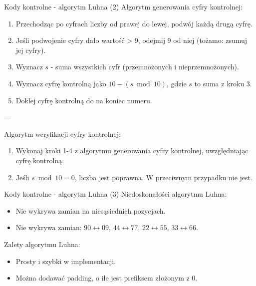 \documentclass[polish,envcountsect,10pt]{beamer}
\begin{document}
\begin{frame}{Kody kontrolne - algorytm Luhna (2)}
    Algorytm generowania cyfry kontrolnej:
    \begin{enumerate}
        \item Przechodząc po cyfrach liczby od prawej do lewej, podwój każdą drugą cyfrę. 
        \item Jeśli podwojenie cyfry dało wartość > 9, odejmij 9 od niej (tożamo: zsumuj jej cyfry).
        \item Wyznacz $s$ - suma wszystkich cyfr (przemnożonych i nieprzemnożonych).
        \item Wyznacz cyfrę kontrolną jako $10 - (s \bmod 10)$, gdzie $s$ to suma z kroku 3.
        \item Doklej cyfrę kontrolną do na koniec numeru.
    \end{enumerate}
    ---
    
    Algorytm weryfikacji cyfry kontrolnej:
    \begin{enumerate}
        \item Wykonaj kroki 1-4 z algorytmu generowania cyfry kontrolnej, uwzględniając cyfrę kontrolną.
        \item Jeśli $s \bmod 10 = 0$, liczba jest poprawna. W przeciwnym przypadku nie jest.
    \end{enumerate}
\end{frame}
%

\begin{frame}{Kody kontrolne - algorytm Luhna (3)}
    Niedoskonałości algorytmu Luhna:
    \begin{itemize}
        \item Nie wykrywa zamian na niesąsiednich pozycjach.
        \item Nie wykrywa zamian: $90 \leftrightarrow 09$, $44 \leftrightarrow 77$, $22 \leftrightarrow 55$, $33 \leftrightarrow 66$.
    \end{itemize}

    Zalety algorytmu Luhna:
    \begin{itemize}
        \item Prosty i szybki w implementacji.
        \item Można dodawać padding, o ile jest prefiksem złożonym z $0$.
    \end{itemize}
\end{frame}
%
\end{document}
